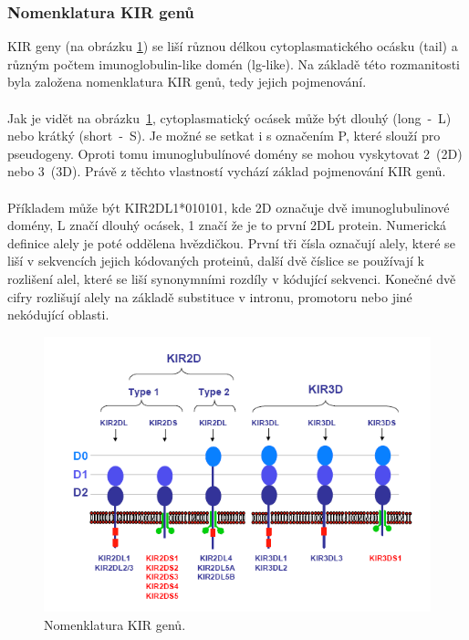 \documentclass[czech,DP]{thesiskiv}
\numberwithin{equation}{section}
\begin{document}
\subsubsection{Nomenklatura KIR genů}
KIR geny (na obrázku \ref{fig:img_kir_nomenklatura}) se liší různou délkou cytoplasmatického ocásku (tail) a různým počtem imunoglobulin-like domén (lg-like). Na základě této rozmanitosti byla založena nomenklatura KIR genů, tedy jejich pojmenování. 
\\
\\
Jak je vidět na obrázku~\ref{fig:img_kir_nomenklatura}, cytoplasmatický ocásek může být dlouhý (long~-~L) nebo krátký (short~-~S). Je možné se setkat i s označením P, které slouží pro pseudogeny. Oproti tomu imunoglubulínové domény se mohou vyskytovat 2~(2D) nebo 3~(3D). Právě z těchto vlastností vychází základ pojmenování KIR genů. 
\\
\\
Příkladem může být KIR2DL1*010101, kde 2D označuje dvě imunoglubulinové domény, L značí dlouhý ocásek, 1 značí že je to první 2DL protein. Numerická definice alely je poté oddělena hvězdičkou. První tři čísla označují alely, které se liší v sekvencích jejich kódovaných proteinů, další dvě číslice se používají k rozlišení alel, které se liší synonymními rozdíly v kódující sekvenci. Konečné dvě cifry rozlišují alely na základě substituce v intronu, promotoru nebo jiné nekódující oblasti. \cite{imgt_hla_database}

\begin{figure}[H]		
		\centering
		\includegraphics[width=\textwidth]{./img/KIR_nomenklatura.png}
		\caption{Nomenklatura KIR genů. \cite{KIR_transplantace_jindra}}
		\label{fig:img_kir_nomenklatura}
\end{figure}
\end{document}
